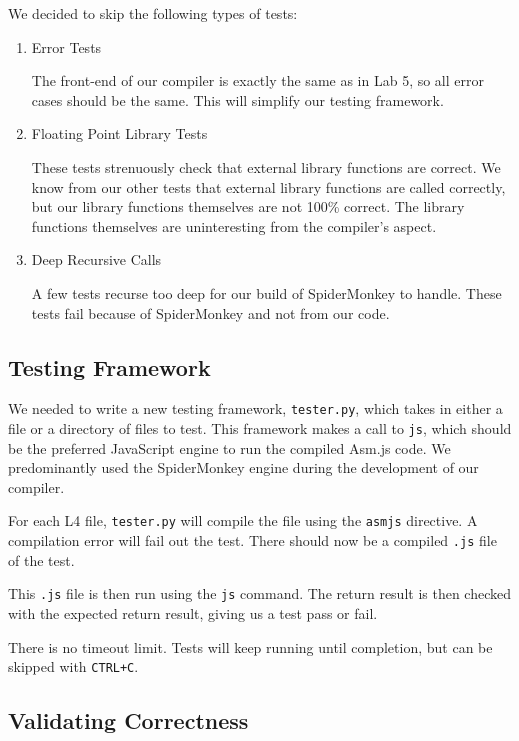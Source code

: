 \documentclass[twoside]{article}
\begin{document}
\begin{multicols}{2}
We decided to skip the following types of tests:

\begin{enumerate}
  \item Error Tests

    The front-end of our compiler is exactly the same as in Lab 5, so all error
    cases should be the same. This will simplify our testing framework.

  \item Floating Point Library Tests

    These tests strenuously check that external library functions are correct.
    We know from our other tests that external library functions are called
    correctly, but our library functions themselves are not 100\% correct.
    The library functions themselves are uninteresting from the compiler's
    aspect.

  \item Deep Recursive Calls

    A few tests recurse too deep for our build of SpiderMonkey to handle. These
    tests fail because of SpiderMonkey and not from our code.
\end{enumerate}

\subsection{Testing Framework}

We needed to write a new testing framework, \texttt{tester.py}, which takes in either a
file or a directory of files to test. This framework makes a call to \texttt{js},
which should be the preferred JavaScript engine to run the compiled Asm.js code.
We predominantly used the SpiderMonkey engine during the development of our
compiler.

For each L4 file, \texttt{tester.py} will compile the file using the \texttt{asmjs}
directive. A compilation error will fail out the test. There should now be a
compiled \texttt{.js} file of the test.

This \texttt{.js} file is then run using the \texttt{js} command. The return
result is then checked with the expected return result, giving us a test pass
or fail.

There is no timeout limit. Tests will keep running until completion, but can be
skipped with \texttt{CTRL+C}.

\subsection{Validating Correctness}


\end{multicols}
\end{document}
